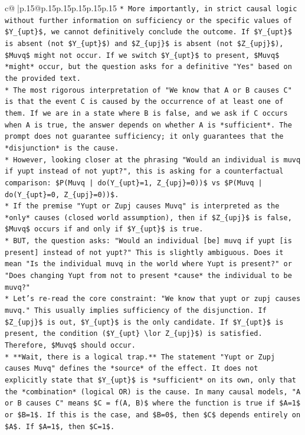 \documentclass{article}
\begin{document}
{\begin{supertabular}{c@{$\;$}|p{.15\linewidth}@{}p{.15\linewidth}p{.15\linewidth}p{.15\linewidth}p{.15\linewidth}p{.15\linewidth}}
{{{\texttt{*   More importantly, in strict causal logic without further information on sufficiency or the specific values of \$Y\_\{upt\}\$, we cannot definitively conclude the outcome. If \$Y\_\{upt\}\$ is absent (not \$Y\_\{upt\}\$) and \$Z\_\{upj\}\$ is absent (not \$Z\_\{upj\}\$), \$Muvq\$ might not occur. If we switch \$Y\_\{upt\}\$ to present, \$Muvq\$ *might* occur, but the question asks for a definitive "Yes" based on the provided text.} \\
\texttt{*   The most rigorous interpretation of "We know that A or B causes C" is that the event C is caused by the occurrence of at least one of them. If we are in a state where B is false, and we ask if C occurs when A is true, the answer depends on whether A is *sufficient*. The prompt does not guarantee sufficiency; it only guarantees that the *disjunction* is the cause.} \\
\texttt{*   However, looking closer at the phrasing "Would an individual is muvq if yupt instead of not yupt?", this is asking for a counterfactual comparison: \$P(Muvq | do(Y\_\{upt\}=1, Z\_\{upj\}=0))\$ vs \$P(Muvq | do(Y\_\{upt\}=0, Z\_\{upj\}=0))\$.} \\
\texttt{*   If the premise "Yupt or Zupj causes Muvq" is interpreted as the *only* causes (closed world assumption), then if \$Z\_\{upj\}\$ is false, \$Muvq\$ occurs if and only if \$Y\_\{upt\}\$ is true.} \\
\texttt{*   BUT, the question asks: "Would an individual {[}be{]} muvq if yupt {[}is present{]} instead of not yupt?" This is slightly ambiguous. Does it mean "Is the individual muvq in the world where Yupt is present?" or "Does changing Yupt from not to present *cause* the individual to be muvq?"} \\
\texttt{*   Let's re{-}read the core constraint: "We know that yupt or zupj causes muvq." This usually implies sufficiency of the disjunction. If \$Z\_\{upj\}\$ is out, \$Y\_\{upt\}\$ is the only candidate. If \$Y\_\{upt\}\$ is present, the condition (\$Y\_\{upt\} \textbackslash{}lor Z\_\{upj\}\$) is satisfied. Therefore, \$Muvq\$ should occur.} \\
\texttt{*   **Wait, there is a logical trap.** The statement "Yupt or Zupj causes Muvq" defines the *source* of the effect. It does not explicitly state that \$Y\_\{upt\}\$ is *sufficient* on its own, only that the *combination* (logical OR) is the cause. In many causal models, "A or B causes C" means \$C = f(A, B)\$ where the function is true if \$A=1\$ or \$B=1\$. If this is the case, and \$B=0\$, then \$C\$ depends entirely on \$A\$. If \$A=1\$, then \$C=1\$.} \\
}}}
\end{supertabular}}
\end{document}
